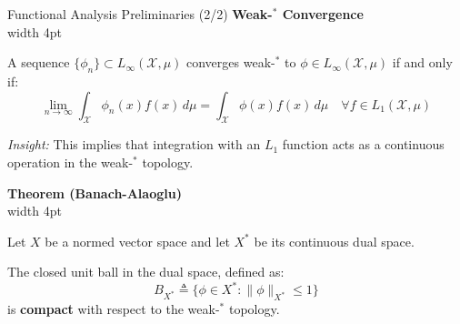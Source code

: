 \documentclass[10pt, aspectratio=169, xcolor=dvipsnames]{beamer}
\newcommand{\lead}[1]{{\color{UniBlue}\bfseries #1}}
\begin{document}
\begin{frame}{Functional Analysis Preliminaries (2/2)}
\lead{Weak-$^\ast$ Convergence}\\
    \vspace{0.1cm}
    \noindent
    {\color{Teal}\vrule width 4pt}%
    \hspace{10pt}%
    \begin{minipage}{\dimexpr\textwidth-14pt\relax}
        \color{Slate}
        A sequence $\{\phi_n\} \subset L_\infty(\mathcal{X}, \mu)$ converges weak-$^\ast$ to $\phi \in L_\infty(\mathcal{X}, \mu)$ if and only if:
        \[ \lim_{n \to \infty} \int_{\mathcal{X}} \phi_n(x) f(x) \, d\mu = \int_{\mathcal{X}} \phi(x) f(x) \, d\mu \quad \forall f \in L_1(\mathcal{X}, \mu) \]
        
        \vspace{0.1cm}
        \textit{Insight:} This implies that integration with an $L_1$ function acts as a continuous operation in the weak-$^\ast$ topology.
    \end{minipage}
    
    \vspace{0.6cm}
    \lead{Theorem (Banach-Alaoglu)}\\
    \vspace{0.1cm}
    \noindent
    {\color{Teal}\vrule width 4pt}%
    \hspace{10pt}%
    \begin{minipage}{\dimexpr\textwidth-14pt\relax}
        \color{Slate}
        Let $X$ be a normed vector space and let $X^*$ be its continuous dual space. 
        
        \vspace{0.1cm}
        The closed unit ball in the dual space, defined as:
        \[ B_{X^*} \triangleq \{ \phi \in X^* : \|\phi\|_{X^*} \le 1 \} \]
        is \textbf{compact} with respect to the weak-$^\ast$ topology. 
    \end{minipage}
\end{frame}
\end{document}
